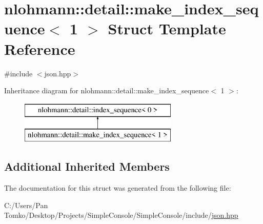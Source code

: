 \hypertarget{structnlohmann_1_1detail_1_1make__index__sequence_3_011_01_4}{}\section{nlohmann\+::detail\+::make\+\_\+index\+\_\+sequence$<$ 1 $>$ Struct Template Reference}
\label{structnlohmann_1_1detail_1_1make__index__sequence_3_011_01_4}


{\ttfamily \#include $<$json.\+hpp$>$}

Inheritance diagram for nlohmann\+::detail\+::make\+\_\+index\+\_\+sequence$<$ 1 $>$\+:\begin{figure}[H]
\begin{center}
\leavevmode
\includegraphics[height=2.000000cm]{d4/d5f/structnlohmann_1_1detail_1_1make__index__sequence_3_011_01_4}
\end{center}
\end{figure}
\subsection*{Additional Inherited Members}


The documentation for this struct was generated from the following file\+:\begin{DoxyCompactItemize}
\item 
C\+:/\+Users/\+Pan Tomko/\+Desktop/\+Projects/\+Simple\+Console/\+Simple\+Console/include/\mbox{\hyperlink{json_8hpp}{json.\+hpp}}\end{DoxyCompactItemize}
